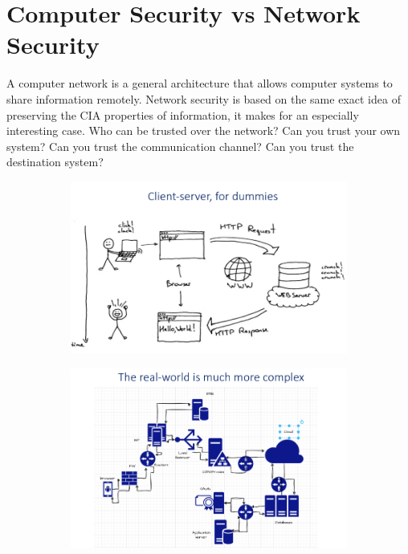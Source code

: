 \section{Computer Security vs Network Security}
A computer network is a general architecture that allows computer systems to share information remotely. Network security is based on the same exact idea of preserving the CIA properties of information, it makes for an especially interesting case.
Who can be trusted over the network? Can you trust your own system? Can you trust the communication channel? Can you trust the destination system?
\begin{figure}[h]
    \centering
    \begin{subfigure}[b]{0.4\textwidth}
        \centering
        \includegraphics[width=\textwidth]{Figures/ClientServer.png}
    \end{subfigure}
    \begin{subfigure}[b]{0.4\textwidth}
        \centering
        \includegraphics[width=\textwidth]{Figures/ClientServer1.png}
    \end{subfigure}
\end{figure}

